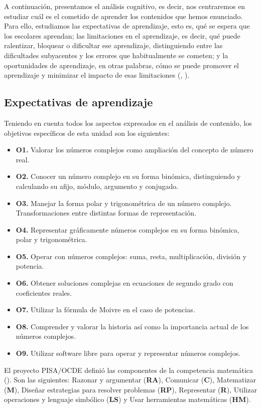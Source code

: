 \documentclass[../main.tex]{memoir}
\begin{document}
A continuación, presentamos el análisis cognitivo, es decir, nos centraremos en estudiar cuál es el cometido de aprender los contenidos que hemos enunciado. Para ello, estudiamos las expectativas de aprendizaje, esto es, qué se espera que los escolares aprendan; las limitaciones en el aprendizaje, es decir, qué puede ralentizar, bloquear o dificultar ese aprendizaje, distinguiendo entre las dificultades subyacentes y los errores que habitualmente se cometen; y la oportunidades de aprendizaje, en otras palabras, cómo se puede promover el aprendizaje y minimizar el impacto de esas limitaciones (\cite{rico2016}, \cite{lupi2013}).

\subsection{Expectativas de aprendizaje}

Teniendo en cuenta todos los aspectos expresados en el análisis de contenido, los objetivos específicos de esta unidad son los siguientes:

\begin{itemize}
	\item \textbf{O1.} Valorar los números complejos como ampliación del concepto de número real.
	\item \textbf{O2.} Conocer un número complejo en su forma binómica, distinguiendo y calculando su afijo, módulo, argumento y conjugado.
	\item \textbf{O3.} Manejar la forma polar y trigonométrica de un número complejo. Transformaciones entre distintas formas de representación.
	\item \textbf{O4.} Representar gráficamente números complejos en su forma binómica, polar y trigonométrica.
	\item \textbf{O5.} Operar con números complejos: suma, resta, multiplicación, división y potencia.
	\item \textbf{O6.} Obtener soluciones complejas en ecuaciones de segundo grado con coeficientes reales.
	\item \textbf{O7.} Utilizar la fórmula de Moivre en el caso de potencias.
	\item \textbf{O8.} Comprender y valorar la historia así como la importancia actual de los números complejos.
	\item \textbf{O9.} Utilizar software libre para operar y representar números complejos.
\end{itemize}

El proyecto PISA/OCDE definió las componentes de la competencia matemática (\cite{pisaocde}). Son las siguientes: Razonar y argumentar (\textbf{RA}), Comunicar (\textbf{C}), Matematizar (\textbf{M}), Diseñar estrategias para resolver problemas (\textbf{RP}), Representar (\textbf{R}), Utilizar operaciones y lenguaje simbólico (\textbf{LS}) y Usar herramientas matemáticas (\textbf{HM}). \\
\end{document}
